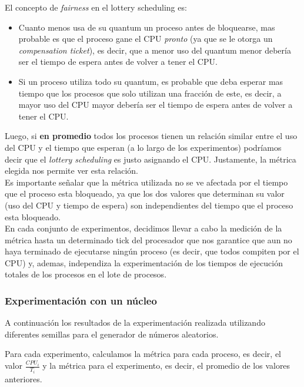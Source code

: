 El concepto de \textit{fairness} en el lottery scheduling es:

\begin{itemize}

	\item Cuanto menos usa de su quantum un proceso antes de bloquearse, mas probable es que el proceso gane el CPU \textit{pronto} (ya que se le otorga un \textit{compensation ticket}), es decir, que a menor uso del quantum menor debería ser el tiempo de espera antes de volver a tener el CPU.

	\item Si un proceso utiliza todo su quantum, es probable que deba esperar mas tiempo que los procesos que solo utilizan una fracción de este, es decir, a mayor uso del CPU mayor debería ser el tiempo de espera antes de volver a tener el CPU.

\end{itemize}

Luego, si \textbf{en promedio} todos los procesos tienen un relación similar entre el uso del CPU y el tiempo que esperan (a lo largo de los experimentos) podríamos decir que el \textit{lottery scheduling} es justo asignando el CPU.
Justamente, la métrica elegida nos permite ver esta relación.\\

Es importante señalar que la métrica utilizada no se ve afectada por el tiempo que el proceso esta bloqueado, ya que los dos valores que determinan su valor (uso del CPU y tiempo de espera) son independientes del tiempo que el proceso esta bloqueado.\\


En cada conjunto de experimentos, decidimos llevar a cabo la medición de la métrica hasta un determinado tick del procesador que nos garantice que aun no haya terminado de ejecutarse ningún proceso (es decir, que todos compiten por el CPU) y, ademas, independiza la experimentación de los tiempos de ejecución totales de los procesos en el lote de procesos.

\subsubsection{Experimentación con un núcleo}

A continuación los resultados de la experimentación realizada utilizando diferentes semillas para el generador de números aleatorios.

Para cada experimento, calculamos la métrica para cada proceso, es decir, el valor $\frac{CPU_i}{T_i}$ y la métrica para el experimento, es decir, el promedio de los valores anteriores.

